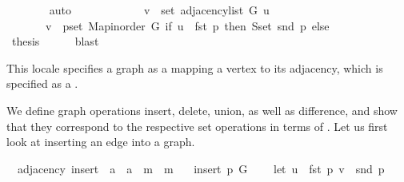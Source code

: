 \begin{isabellebody}
\ \ \ \ \ \ \isamarkupfalse%
\ auto\isanewline
\ \ \ \ \isamarkupfalse%
\ \isamarkupfalse%
\isanewline
\ \ \ \ \ \ {\isachardoublequoteopen}v\ {\isasymin}\ set\ {\isacharparenleft}{\kern0pt}adjacency{\isacharunderscore}{\kern0pt}list\ G\ u{\isacharparenright}{\kern0pt}\ {\isasymlongleftrightarrow}\isanewline
\ \ \ \ \ \ \ v\ {\isasymin}\ {\isacharparenleft}{\kern0pt}{\isasymUnion}p{\isasymin}set\ {\isacharparenleft}{\kern0pt}Map{\isacharunderscore}{\kern0pt}inorder\ G{\isacharparenright}{\kern0pt}{\isachardot}{\kern0pt}\ if\ u\ {\isacharequal}{\kern0pt}\ fst\ p\ then\ S{\isachardot}{\kern0pt}set\ {\isacharparenleft}{\kern0pt}snd\ p{\isacharparenright}{\kern0pt}\ else\ {\isacharbraceleft}{\kern0pt}{\isacharbraceright}{\kern0pt}{\isacharparenright}{\kern0pt}{\isachardoublequoteclose}\isanewline
\ \ \ \ \ \ \isacommand{{\isachardot}{\kern0pt}}\isamarkupfalse%
\ \isacommand{{\isacharbraceright}{\kern0pt}}\isamarkupfalse%
\isanewline
\ \ \isamarkupfalse%
\ {\isacharquery}{\kern0pt}thesis\isanewline
\ \ \ \ \isamarkupfalse%
\ blast\isanewline
{}\isamarkupfalse%
%
\endisatagproof
{\isafoldproof}%
%
\isadelimproof
%
\endisadelimproof
%
\begin{isamarkuptext}%
This locale specifies a graph as a  mapping a vertex to its adjacency, which
is specified as a .%
\end{isamarkuptext}\isamarkuptrue%
%
\begin{isamarkuptext}%
We define graph operations insert, delete, union, as well as difference, and show that they
correspond to the respective set operations in terms of . Let us
first look at inserting an edge into a graph.%
\end{isamarkuptext}\isamarkuptrue%
\isamarkupfalse%
\ {\isacharparenleft}{\kern0pt}\ adjacency{\isacharparenright}{\kern0pt}\ insert\ {\isacharcolon}{\kern0pt}{\isacharcolon}{\kern0pt}\ {\isachardoublequoteopen}{\isacharprime}{\kern0pt}a\ {\isasymtimes}\ {\isacharprime}{\kern0pt}a\ {\isasymRightarrow}\ {\isacharprime}{\kern0pt}m\ {\isasymRightarrow}\ {\isacharprime}{\kern0pt}m{\isachardoublequoteclose}\ \isanewline
\ \ {\isachardoublequoteopen}insert\ p\ G\ {\isasymequiv}\isanewline
\ \ \ let\ u\ {\isacharequal}{\kern0pt}\ fst\ p{\isacharsemicolon}{\kern0pt}\ v\ {\isacharequal}{\kern0pt}\ snd\ p\isanewline

\end{isabellebody}

